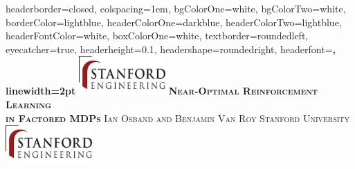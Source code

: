 \documentclass[landscape,a0paper,fontscale=0.285]{baposter} %
\theoremstyle{definition}
\begin{document}
\begin{poster}
{
headerborder=closed, %
colspacing=1em, %
bgColorOne=white, %
bgColorTwo=white, %
borderColor=lightblue, %
headerColorOne=darkblue, %
headerColorTwo=lightblue, %
headerFontColor=white, %
boxColorOne=white, %
textborder=roundedleft, %
eyecatcher=true, %
headerheight=0.1\textheight, %
headershape=roundedright, %
headerfont=\Large\bf\textsc, %
linewidth=2pt %
}
%
{\includegraphics[height=4em]{logo}} %
{\bf\textsc{Near-Optimal Reinforcement Learning \\ \vspace{1mm} in Factored MDPs}\vspace{0.5em}} %
{\textsc{ Ian Osband and Benjamin Van Roy \hspace{12pt} Stanford University}} %
{\includegraphics[height=4em]{logo}} %



\end{poster}
\end{document}
